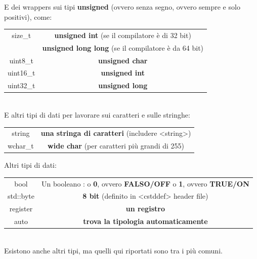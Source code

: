 \textsf{\small E dei wrappers sui tipi \textbf{unsigned} (ovvero senza segno, ovvero sempre e solo positivi), come: }\\

\begin{tabular}{cc}
	\color{myblue2}size\_t & \textbf{unsigned int} (se il compilatore è di 32 bit) \\
	 & \textbf{unsigned long long} (se il compilatore è da 64 bit) \\
	\color{myblue2}uint8\_t & \textbf{unsigned char} \\
	\color{myblue2}uint16\_t & \textbf{unsigned int}  \\
	\color{myblue2}uint32\_t & \textbf{unsigned long} \\ 
\end{tabular} \\

\textsf{\small E altri tipi di dati per lavorare sui caratteri e sulle stringhe: }\\

\begin{tabular}{cc}
	\color{myblue2}string & \textbf{una stringa di caratteri} (includere <string>) \\
	\color{myblue2}wchar\_t & \textbf{wide char} (per caratteri più grandi di 255) \\
\end{tabular}

\break

\textsf{\small Altri tipi di dati: } \\

\begin{tabular}{cc} %
	\color{myblue2}bool & Un booleano : o \textbf{0}, ovvero \textbf{FALSO/OFF} o \textbf{1}, ovvero \textbf{TRUE/ON} \\
	\color{myblue2}std::byte & \textbf{8 bit} (definito in <cstddef> header file) \\
	\color{myblue2}register &  \textbf{un registro} \\ 
	\color{myblue2} auto &  \textbf{trova la tipologia automaticamente} \\
\end{tabular}\\

\textsf{\small Esistono anche altri tipi, ma quelli qui riportati sono tra i più comuni.}\\

